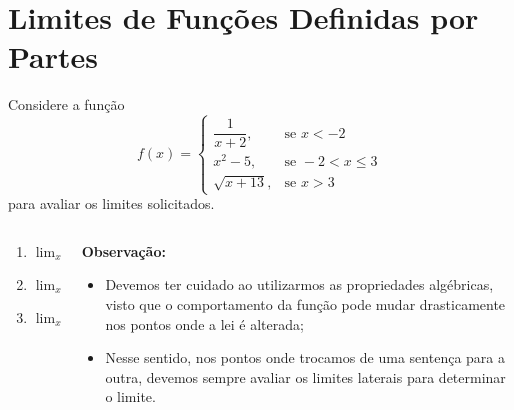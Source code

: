 \section{Limites de Funções Definidas por Partes}

\begin{frame}
  \begin{example}
    Considere a função
    \begin{equation*}
      f(x) = \begin{cases}
        \dfrac{1}{x+2}, &\mbox{se } x < -2\\
        x^{2} - 5, &\mbox{se } -2 < x \leq 3\\
        \sqrt{x + 13}, &\mbox{se } x>3
      \end{cases}
    \end{equation*}
    para avaliar os limites solicitados.
  \end{example}
  \begin{columns}[onlytextwidth]
    \begin{column}{0.3\textwidth}
      \begin{enumerate}
        \item $\displaystyle\lim_{x\to -2}f(x)$
        \item $\displaystyle\lim_{x\to 0}f(x)$
        \item $\displaystyle\lim_{x\to 3}f(x)$
      \end{enumerate}
    \end{column}
    \begin{column}{0.7\textwidth}
      \begin{highlight}
        \textbf{Observação:}
        \begin{itemize}
          \item Devemos ter cuidado ao utilizarmos as propriedades algébricas, visto que o comportamento da função pode mudar drasticamente nos pontos onde a lei é alterada;
          \item Nesse sentido, nos pontos onde trocamos de uma sentença para a outra, devemos sempre avaliar os limites laterais para determinar o limite.
        \end{itemize}
      \end{highlight}
    \end{column}
  \end{columns}
\end{frame}